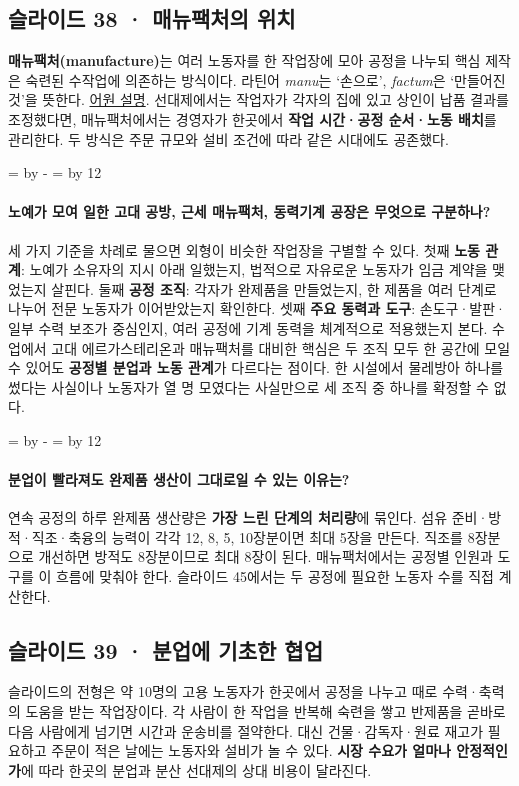 \documentclass[10pt,a4paper]{article}
\newcommand{\ReserveQuestionSpace}{%
  \par\begingroup
  \dimen0=\pagegoal \advance\dimen0 by -\pagetotal
  \dimen2=\baselineskip \multiply\dimen2 by 12
  \ifdim\dimen0<\dimen2 \newpage\fi
  \endgroup}
\begin{document}
\subsection{슬라이드 38 · 매뉴팩처의 위치}
\textbf{매뉴팩처(manufacture)}는 여러 노동자를 한 작업장에 모아 공정을 나누되 핵심 제작은 숙련된 수작업에 의존하는 방식이다. 라틴어 \emph{manu}는 ‘손으로’, \emph{factum}은 ‘만들어진 것’을 뜻한다. \href{https://www.oxfordlearnersdictionaries.com/us/definition/english/manufacture\_2}{어원 설명}. 선대제에서는 작업자가 각자의 집에 있고 상인이 납품 결과를 조정했다면, 매뉴팩처에서는 경영자가 한곳에서 \textbf{작업 시간·공정 순서·노동 배치}를 관리한다. 두 방식은 주문 규모와 설비 조건에 따라 같은 시대에도 공존했다.\par

\ReserveQuestionSpace
\paragraph{노예가 모여 일한 고대 공방, 근세 매뉴팩처, 동력기계 공장은 무엇으로 구분하나?}
세 가지 기준을 차례로 물으면 외형이 비슷한 작업장을 구별할 수 있다. 첫째 \textbf{노동 관계}: 노예가 소유자의 지시 아래 일했는지, 법적으로 자유로운 노동자가 임금 계약을 맺었는지 살핀다. 둘째 \textbf{공정 조직}: 각자가 완제품을 만들었는지, 한 제품을 여러 단계로 나누어 전문 노동자가 이어받았는지 확인한다. 셋째 \textbf{주요 동력과 도구}: 손도구·발판·일부 수력 보조가 중심인지, 여러 공정에 기계 동력을 체계적으로 적용했는지 본다. 수업에서 고대 에르가스테리온과 매뉴팩처를 대비한 핵심은 두 조직 모두 한 공간에 모일 수 있어도 \textbf{공정별 분업과 노동 관계}가 다르다는 점이다. 한 시설에서 물레방아 하나를 썼다는 사실이나 노동자가 열 명 모였다는 사실만으로 세 조직 중 하나를 확정할 수 없다.\par

\ReserveQuestionSpace
\paragraph{분업이 빨라져도 완제품 생산이 그대로일 수 있는 이유는?}

연속 공정의 하루 완제품 생산량은 \textbf{가장 느린 단계의 처리량}에 묶인다. 섬유 준비·방적·직조·축융의 능력이 각각 12, 8, 5, 10장분이면 최대 5장을 만든다. 직조를 8장분으로 개선하면 방적도 8장분이므로 최대 8장이 된다. 매뉴팩처에서는 공정별 인원과 도구를 이 흐름에 맞춰야 한다. 슬라이드 45에서는 두 공정에 필요한 노동자 수를 직접 계산한다.\par

\subsection{슬라이드 39 · 분업에 기초한 협업}
슬라이드의 전형은 약 10명의 고용 노동자가 한곳에서 공정을 나누고 때로 수력·축력의 도움을 받는 작업장이다. 각 사람이 한 작업을 반복해 숙련을 쌓고 반제품을 곧바로 다음 사람에게 넘기면 시간과 운송비를 절약한다. 대신 건물·감독자·원료 재고가 필요하고 주문이 적은 날에는 노동자와 설비가 놀 수 있다. \textbf{시장 수요가 얼마나 안정적인가}에 따라 한곳의 분업과 분산 선대제의 상대 비용이 달라진다.\par
\end{document}
